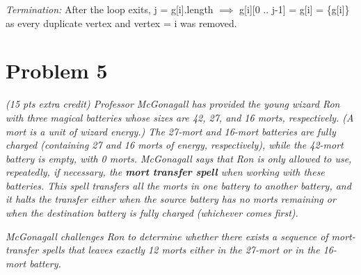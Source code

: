 \documentclass[12pt]{article} \setlength{\oddsidemargin}{0in}
\begin{document}
\textit{Termination: } After the loop exits, j = g[i].length $\implies$ g[i][0 .. j-1] = g[i] = \{g[i]\} as every duplicate vertex and vertex = i was removed. 

\newpage


\section*{Problem 5}

\textit{(15 pts extra credit) Professor McGonagall has provided the
  young wizard Ron with three magical batteries whose sizes are 42,
  27, and 16 morts, respectively. (A mort is a unit of wizard energy.)
  The 27-mort and 16-mort batteries are fully charged (containing 27
  and 16 morts of energy, respectively), while the 42-mort battery is
  empty, with 0 morts. McGonagall says that Ron is only allowed to
  use, repeatedly, if necessary, the \textbf{mort transfer spell} when
  working with these batteries. This spell transfers all the morts in
  one battery to another battery, and it halts the transfer either
  when the source battery has no morts remaining or when the
  destination battery is fully charged (whichever comes first).}

\textit{McGonagall challenges Ron to determine whether there exists a
  sequence of mort-transfer spells that leaves exactly 12 morts either
  in the 27-mort or in the 16-mort battery.}
\end{document}
